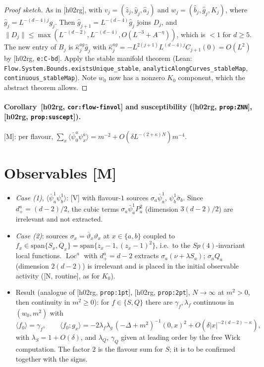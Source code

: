 \documentclass[11pt]{article}
\theoremstyle{remark}
\theoremstyle{definition}
\newcommand{\Loc}{\operatorname{Loc}}
\newcommand{\avg}[1]{\langle #1\rangle}
\newcommand{\st}[1]{\textsf{[#1]}}
\newcommand{\hr}[1]{\textup{[h02rg, \texttt{#1}]}}
\begin{document}
\begin{proof}[Proof sketch]
As in [h02rg], with $v_j=(\hat z_j,\hat y_j,\hat a_j)$ and $w_j=(\hat b_j,\hat g_j,K_j)$, where $\hat g_j=L^{-(d-4)j}g_j$.
Then $\hat g_{j+1}=L^{-(d-4)}\hat g_j$ joins $D_j$, and $\|D_j\|\le\max(L^{-(d-2)},L^{-(d-4)},O(L^{-3}+A^{-\eta}))$,
which is $<1$ for $d\ge5$.
The new entry of $B_j$ is $\hat\kappa^{ag}_j\hat g_j$ with $\hat\kappa^{ag}_j=-L^{2(j+1)}L^{(d-4)j}C_{j+1}(0)=O(L^2)$ by \hr{e:C-bd}.
Apply the stable manifold theorem (Lean: \texttt{Flow.System.Bounds.existsUnique\_stable}, \texttt{analyticAlongCurves\_stableMap},
\texttt{continuous\_stableMap}). Note $w_0$ now has a nonzero $K_0$ component, which the abstract theorem allows.
\end{proof}

\paragraph{Corollary~\hr{cor:flow-finvol} and susceptibility (\hr{prop:ZNN}, \hr{prop:suscept}).}
\st{M}: per flavour, $\sum_x\avg{\bar\psi^a_0\psi^a_x}=m^{-2}+O(\delta L^{-(2+\kappa)N})m^{-4}$.

\section{Observables \st{M}}

\begin{itemize}
\item \emph{Case (1)}, $\avg{\bar\psi^1_a\psi^1_b}$: \st{V} with flavour-$1$ sources $\sigma_a\bar\psi^1_a$, $\psi^1_b\bar\sigma_b$.
  Since $d_+^a=(d-2)/2$, the cubic terms $\sigma_a\bar\psi^1_aP^2_a$ (dimension $3(d-2)/2$) are irrelevant and not extracted.
\item \emph{Case (2)}: sources $\sigma_x=\bar\vartheta_x\vartheta_x$ at $x\in\{a,b\}$ coupled to
  $f_x\in\mathrm{span}\{S_x,Q_x\}=\mathrm{span}\{z_x-1,(z_x-1)^2\}$, i.e.\ to the $Sp(4)$-invariant local functions.
  $\Loc^a$ with $d_+^a=d-2$ extracts $\sigma_a(\nu+\lambda S_a)$; $\sigma_aQ_a$ (dimension $2(d-2)$) is irrelevant and is placed in the
  initial observable activity (\st{N, routine}, as for $K_0$).
\item Result (analogue of \hr{prop:1pt}, \hr{prop:2pt}, $N\to\infty$ at $m^2>0$, then continuity in $m^2\ge0$): for
  $f\in\{S,Q\}$ there are $\gamma_f,\lambda_f$ continuous in $(w_0,m^2)$ with
  \begin{equation}
    \avg{f_0}=\gamma_f,\qquad \avg{f_0;g_x}=-2\lambda_f\lambda_g\,(-\Delta+m^2)^{-1}(0,x)^2+O(\delta|x|^{-2(d-2)-\kappa}),
  \end{equation}
  with $\lambda_S=1+O(\delta)$, and $\lambda_Q$, $\gamma_Q$ given at leading order by the free Wick computation.
  The factor $2$ is the flavour sum for $S$; it is to be confirmed together with the signs.
\end{itemize}
\end{document}
